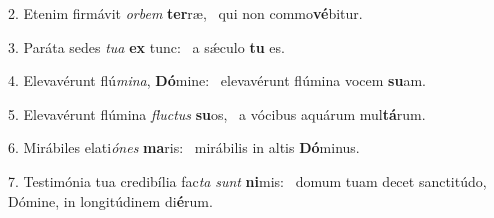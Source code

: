 2. Etenim firmávit \textit{or}\textit{bem} \textbf{ter}ræ, \ast\  qui non commo\textbf{vé}bitur.\

3. Paráta sedes \textit{tu}\textit{a} \textbf{ex} tunc: \ast\  a sǽculo \textbf{tu} es.\

4. Elevavérunt flú\textit{mi}\textit{na}, \textbf{Dó}mine: \ast\  elevavérunt flúmina vocem \textbf{su}am.\

5. Elevavérunt flúmina \textit{fluc}\textit{tus} \textbf{su}os, \ast\  a vócibus aquárum mul\textbf{tá}rum.\

6. Mirábiles elati\textit{ó}\textit{nes} \textbf{ma}ris: \ast\  mirábilis in altis \textbf{Dó}minus.\

7. Testimónia tua credibília fac\textit{ta} \textit{sunt} \textbf{ni}mis: \ast\  domum tuam decet sanctitúdo, Dómine, in longitúdinem di\textbf{é}rum.\

